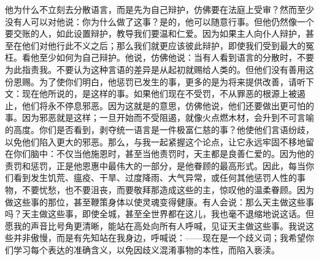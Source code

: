 他为什么不立刻去分散语言，而是先为自己辩护，仿佛要在法庭上受审？然而至少没有人可以对他说：你为什么做了这事？是的，他可以随意行事。但他仍然像一个要交账的人，如此设置辩护，教导我们要温和仁爱。因为如果主人向仆人辩护，甚至在他们对他行此不义之后；那么我们就更应该彼此辩护，即使我们受到最大的冤枉。看他至少如何为自己辩护。他说，仿佛他说：当有人看到语言的分散时，不要为此指责我。不要认为这种言语的差异是从起初就赐给人类的。但他们没有善用这份恩赐。为了使你们明白，他惩罚已发生的事，更多的是为将来提供改善，请听下文：现在他所说的，是这样的事。如果他们现在不受罚，不从罪恶的根源上被遏止，他们将永不停息邪恶。因为这就是的意思，仿佛他说，他们还要做出更可怕的事。因为邪恶就是这样；一旦开始而不受阻遏，就像火点燃木材，会升到不可言喻的高度。你们是否看到，剥夺统一语言是一件极富仁慈的事？他使他们言语纷歧，以免他们陷入更大的邪恶。那么，与我一起紧握这个论点，让它永远牢固不移地留在你们脑中：不仅当他施恩时，甚至当他责罚时，天主都是良善仁爱的。因为他的责罚和惩罚，正是他恩惠中最伟大的一部分，是他眷顾的最高形式。因此，每当你们看到发生饥荒、瘟疫、干旱、过度降雨、大气异常，或任何其他惩罚人性的事物，不要忧愁，也不要沮丧，而要敬拜那造成这些的主，惊叹他的温柔眷顾。因为做这些事的那位，甚至鞭策身体以使灵魂变得健康。有人会说：那么天主做这些事吗？天主做这些事，即使全城，甚至全世界都在这儿，我也毫不退缩地说这话。但愿我的声音比号角更清晰，能站在高处向所有人呼喊，见证天主做这些事。我说这些并非傲慢，而是有先知站在我身边，呼喊说：——现在是一个歧义词；我希望你们学习每个表达的准确含义，以免因歧义混淆事物的本性，而陷入亵渎。\par


